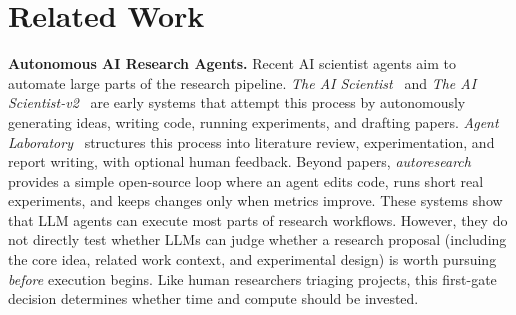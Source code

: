 \section{Related Work}

\textbf{Autonomous AI Research Agents.}
Recent AI scientist agents aim to automate large parts of the research pipeline. \textit{The AI Scientist}~\citep{lu2024aiscientist} and \textit{The AI Scientist-v2}~\citep{yamada2025aiscientistv2} are early systems that attempt this process by autonomously generating ideas, writing code, running experiments, and drafting papers. \textit{Agent Laboratory}~\citep{schmidgall2025agentlab} structures this process into literature review, experimentation, and report writing, with optional human feedback. Beyond papers, \textit{autoresearch}~\citep{karpathy2026autoresearch} provides a simple open-source loop where an agent edits code, runs short real experiments, and keeps changes only when metrics improve. These systems show that LLM agents can execute most parts of research workflows. However, they do not directly test whether LLMs can judge whether a research proposal (including the core idea, related work context, and experimental design) is worth pursuing \emph{before} execution begins. Like human researchers triaging projects, this first-gate decision determines whether time and compute should be invested.


